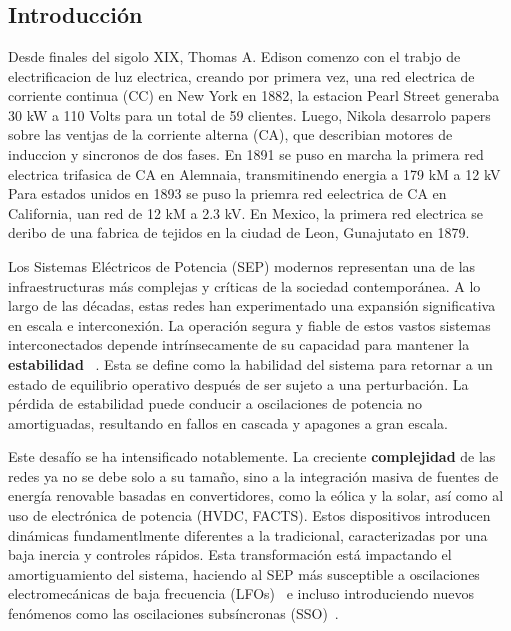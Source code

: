 \renewcommand{\chaptername}{Protocolo}
\chapter{}


\section{Introducción}
Desde finales del sigolo XIX, Thomas A. Edison comenzo con el trabjo de electrificacion de luz electrica,
creando por primera vez, una red electrica de corriente continua (CC) en New York en 1882, la estacion Pearl Street 
generaba 30 kW a 110 Volts para un total de 59 clientes. Luego, Nikola desarrolo papers sobre las ventjas 
de la corriente alterna (CA), que describian motores de induccion y sincronos de dos fases. En 1891 se
puso en marcha la primera red electrica trifasica de CA en Alemnaia, transmitinendo energia a 179 kM a 12 kV
Para estados unidos en 1893 se puso la priemra red eelectrica de CA en California, uan red de 12 kM a 2.3 kV. 
En Mexico, la primera red electrica se deribo de una fabrica de tejidos en la ciudad de Leon, Gunajutato 
en 1879.

Los Sistemas Eléctricos de Potencia (SEP) modernos representan una de las infraestructuras más complejas 
y críticas de la sociedad contemporánea. A lo largo de las décadas, estas redes han experimentado una 
expansión significativa en escala e interconexión. La operación segura y fiable de estos vastos sistemas
 interconectados depende intrínsecamente de su capacidad para mantener la \textbf{estabilidad}~
 \cite{2}. Esta se define como la habilidad del sistema para retornar a un estado de 
 equilibrio operativo después de ser sujeto a una perturbación. La pérdida de estabilidad puede conducir 
 a oscilaciones de potencia no amortiguadas, resultando en fallos en cascada y apagones a gran escala.

Este desafío se ha intensificado notablemente. La creciente \textbf{complejidad} de las redes ya no 
se debe solo a su tamaño, sino a la integración masiva de fuentes de energía renovable basadas en 
convertidores, como la eólica y la solar, así como al uso de electrónica de potencia (HVDC, 
FACTS). Estos dispositivos introducen dinámicas fundamentlmente diferentes a la tradicional, 
caracterizadas por una baja inercia y controles rápidos. Esta transformación está impactando el 
amortiguamiento del sistema, haciendo al SEP más susceptible a oscilaciones electromecánicas de 
baja frecuencia (LFOs)~\cite{6} e incluso introduciendo nuevos fenómenos como las oscilaciones 
subsíncronas (SSO)~\cite{9}.

